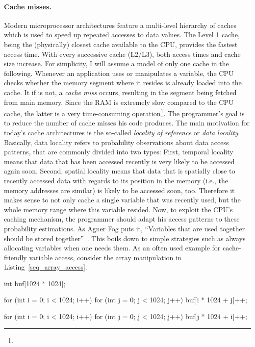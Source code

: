 \paragraph{Cache misses.} Modern microprocessor architectures feature a multi-level hierarchy of caches which is used to speed up repeated accesses to data values. The Level 1 cache, being the (physically) closest cache available to the CPU, provides the fastest access time. With every successive cache (L2/L3), both access times and cache size increase. For simplicity, I will assume a model of only one cache in the following. Whenever an application uses or manipulates a variable, the CPU checks whether the memory segment where it resides is already loaded into the cache. It if is not, a \emph{cache miss} occurs, resulting in the segment being fetched from main memory. Since the RAM is extremely slow compared to the CPU cache, the latter is a very time-consuming operation\footnote{}. The programmer's goal is to reduce the number of cache misses his code produces. The main motivation for today's cache architectures is the so-called \emph{locality of reference} or \emph{data locality}. Basically, data locality refers to probability observations about data access patterns, that are commonly divided into two types: First, temporal locality means that data that has been accessed recently is very likely to be accessed again soon. Second, spatial locality means that data that is spatially close to recently accessed data with regards to its position in the memory (i.e., the memory addresses are similar) is likely to be accessed soon, too. Therefore it makes sense to not only cache a single variable that was recently used, but the whole memory range where this variable resided. Now, to exploit the CPU's caching mechanism, the programmer should adapt his access patterns to these probability estimations. As Agner Fog puts it, ``Variables that are used together should be stored together''~\cite[p. 88]{fog2011optimizing}. This boils down to simple strategies such as always allocating variables when one needs them. As an often used example for cache-friendly variable access, consider the array manipulation in Listing~\ref{seq_array_access}.
\begin{code}[caption={Sequential vs. non-sequential array access}, label=seq_array_access]
int buf[1024 * 1024];

for (int i = 0; i < 1024; i++)
  for (int j = 0; j < 1024; j++)
    buf[i * 1024 + j]++;

for (int i = 0; i < 1024; i++)
  for (int j = 0; j < 1024; j++)
    buf[j * 1024 + i]++;
\end{code}

